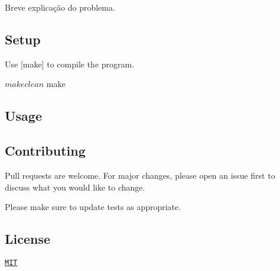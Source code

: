 Breve explicação do problema.

\subsection*{Setup}

Use \mbox{[}make\mbox{]} to compile the program.


\begin{DoxyCode}
$ make clean
$ make
\end{DoxyCode}


\subsection*{Usage}




\subsection*{Contributing}

Pull requests are welcome. For major changes, please open an issue first to discuss what you would like to change.

Please make sure to update tests as appropriate.

\subsection*{License}

\href{https://choosealicense.com/licenses/mit/}{\tt M\+IT} 